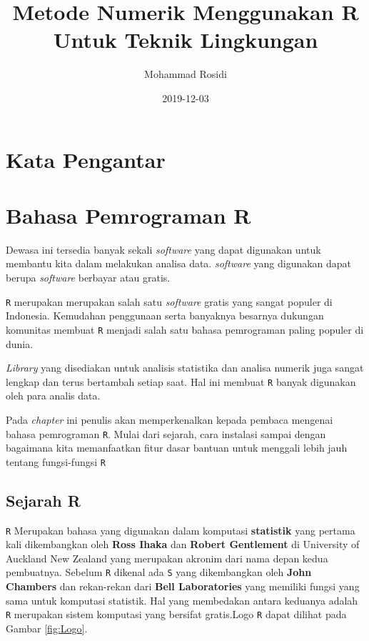 \documentclass[]{book}
\title{Metode Numerik Menggunakan R Untuk Teknik Lingkungan}
\author{Mohammad Rosidi}
\date{2019-12-03}
\theoremstyle{definition}
\theoremstyle{definition}
\theoremstyle{definition}
\theoremstyle{remark}
\begin{document}
\maketitle

{
\setcounter{tocdepth}{1}
\tableofcontents
}
\hypertarget{kata-pengantar}{%
\chapter*{Kata Pengantar}\label{kata-pengantar}}

\hypertarget{intro}{%
\chapter{Bahasa Pemrograman R}\label{intro}}

Dewasa ini tersedia banyak sekali \emph{software} yang dapat digunakan untuk membantu kita dalam melakukan analisa data. \emph{software} yang digunakan dapat berupa \emph{software} berbayar atau gratis.

\texttt{R} merupakan merupakan salah satu \emph{software} gratis yang sangat populer di Indonesia. Kemudahan penggunaan serta banyaknya besarnya dukungan komunitas membuat \texttt{R} menjadi salah satu bahasa pemrograman paling populer di dunia.

\emph{Library} yang disediakan untuk analisis statistika dan analisa numerik juga sangat lengkap dan terus bertambah setiap saat. Hal ini membuat \texttt{R} banyak digunakan oleh para analis data.

Pada \emph{chapter} ini penulis akan memperkenalkan kepada pembaca mengenai bahasa pemrograman \texttt{R}. Mulai dari sejarah, cara instalasi sampai dengan bagaimana kita memanfaatkan fitur dasar bantuan untuk menggali lebih jauh tentang fungsi-fungsi \texttt{R}

\hypertarget{sejarahR}{%
\section{Sejarah R}\label{sejarahR}}

\texttt{R} Merupakan bahasa yang digunakan dalam komputasi \textbf{statistik} yang pertama kali dikembangkan oleh \textbf{Ross Ihaka} dan \textbf{Robert Gentlement} di University of Auckland New Zealand yang merupakan akronim dari nama depan kedua pembuatnya. Sebelum \texttt{R} dikenal ada \texttt{S} yang dikembangkan oleh \textbf{John Chambers} dan rekan-rekan dari \textbf{Bell Laboratories} yang memiliki fungsi yang sama untuk komputasi statistik. Hal yang membedakan antara keduanya adalah \texttt{R} merupakan sistem komputasi yang bersifat gratis.Logo \texttt{R} dapat dilihat pada Gambar \ref{fig:Logo}.
\end{document}
